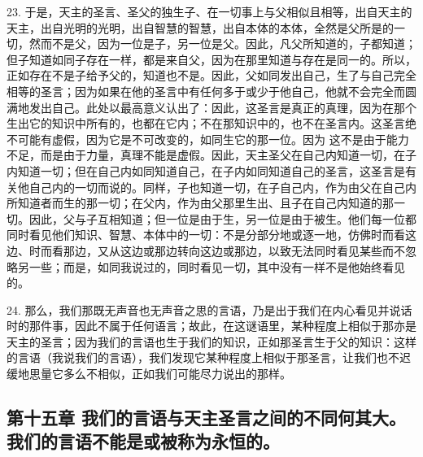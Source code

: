 23. 于是，天主的圣言、圣父的独生子、在一切事上与父相似且相等，出自天主的天主，出自光明的光明，出自智慧的智慧，出自本体的本体，全然是父所是的一切，然而不是父，因为一位是子，另一位是父。因此，凡父所知道的，子都知道；但子知道如同子存在一样，都是来自父，因为在那里知道与存在是同一的。所以，正如存在不是子给予父的，知道也不是。因此，父如同发出自己，生了与自己完全相等的圣言；因为如果在他的圣言中有任何多于或少于他自己，他就不会完全而圆满地发出自己。此处以最高意义认出了：因此，这圣言是真正的真理，因为在那个生出它的知识中所有的，也都在它内；不在那知识中的，也不在圣言内。这圣言绝不可能有虚假，因为它是不可改变的，如同生它的那一位。因为 这不是由于能力不足，而是由于力量，真理不能是虚假。因此，天主圣父在自己内知道一切，在子内知道一切；但在自己内如同知道自己，在子内如同知道自己的圣言，这圣言是有关他自己内的一切而说的。同样，子也知道一切，在子自己内，作为由父在自己内所知道者而生的那一切；在父内，作为由父那里生出、且子在自己内知道的那一切。因此，父与子互相知道；但一位是由于生，另一位是由于被生。他们每一位都同时看见他们知识、智慧、本体中的一切：不是分部分地或逐一地，仿佛时而看这边、时而看那边，又从这边或那边转向这边或那边，以致无法同时看见某些而不忽略另一些；而是，如同我说过的，同时看见一切，其中没有一样不是他始终看见的。\par

24. 那么，我们那既无声音也无声音之思的言语，乃是出于我们在内心看见并说话时的那件事，因此不属于任何语言；故此，在这谜语里，某种程度上相似于那亦是天主的圣言；因为我们的言语也生于我们的知识，正如那圣言生于父的知识：这样的言语（我说我们的言语），我们发现它某种程度上相似于那圣言，让我们也不迟缓地思量它多么不相似，正如我们可能尽力说出的那样。\par


\subsection{第十五章 我们的言语与天主圣言之间的不同何其大。我们的言语不能是或被称为永恒的。}


